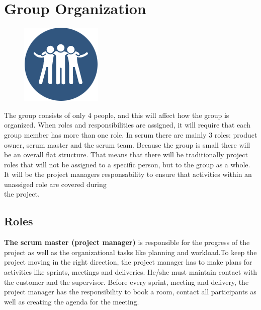 \clearpage
\section{Group Organization}

\begin{figure}
  \begin{center}
  \includegraphics[scale=0.72]{pictures/team.png}
  \end{center}
\end{figure}

The group consists of only 4 people, and this will affect how the group is organized. When roles and responsibilities are assigned, it will require that each group member has more than one role. In scrum there are mainly 3 roles: product owner, scrum master and the scrum team. Because the group is small there will be an overall flat structure. That means that
there will be traditionally project roles that will not be assigned to a specific person, but to the group as a whole. It will be the project managers responsability to ensure that activities within an unassiged role are covered during \\ the project.

\subsection{Roles}

{\bf The scrum master (project manager)} is responsible for the progress of the project as well as the organizational tasks like planning and workload.To keep the project moving in the right direction, the project manager has to make plans for activities like sprints, meetings and deliveries. He/she must maintain contact with the customer and the supervisor.
Before every sprint, meeting and delivery, the project manager has the responsibility to book a room, contact all
participants as well as creating the agenda for the meeting. \\

